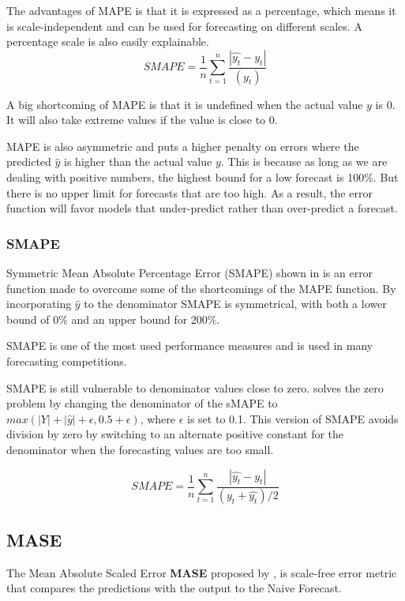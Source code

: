 The advantages of MAPE is that it is expressed as a percentage, which means
it is scale-independent and can be used for forecasting on different scales.
A percentage scale is also easily explainable.
\begin{equation}
  \label{eq:Mape}
  SMAPE = \frac{1}{n} \sum_{t=1}^n \frac{|\hat{y_t} - y_t|}{(y_t)}
\end{equation}

A big shortcoming of MAPE is that it is undefined when the actual value $y$ is 0.
It will also take extreme values if the value is close to 0.

MAPE is also asymmetric and puts a higher penalty on errors where the predicted
$\hat{y}$ is higher than the actual value $y$.
This is because as long as we are dealing with positive numbers,
the highest bound for a low forecast is 100\%. But there is no upper limit
for forecasts that are too high. As a result, the error function will
favor models that under-predict rather than over-predict a forecast.

\subsubsection{SMAPE}
Symmetric Mean Absolute Percentage Error (SMAPE) shown in 
is an error function made to overcome some of the shortcomings of the MAPE function.
By incorporating $\hat{y}$ to the denominator SMAPE is symmetrical,
with both a lower bound of 0\% and an upper bound for 200\%.

SMAPE is one of the most used performance measures and is used in many forecasting competitions.

SMAPE is still vulnerable to denominator values close to zero.
\cite{Hewamalage2021} solves the zero problem by changing the denominator
of the sMAPE to $max(|Y| + |\hat{y}| + \epsilon, 0.5 + \epsilon)$, where $\epsilon$
is set to 0.1.
This version of SMAPE avoids division by zero by switching to an alternate positive
constant for the denominator when the forecasting values are too small.


\begin{equation}
  \label{eq:sMape}
  SMAPE = \frac{1}{n} \sum_{t=1}^n \frac{|\hat{y_t} - y_t|}{(y_t + \hat{y_t}) / 2}
\end{equation}

\subsection{MASE}
The Mean Absolute Scaled Error \textbf{MASE}
proposed by \cite{Hyndman2006}, is scale-free
error metric that compares the predictions with
the output to the Naive Forecast.


